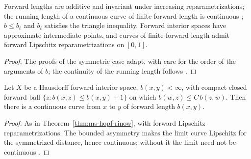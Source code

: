 \begin{theorem}
  \label{thm:ms-fwd-length}
  \leanok
  Forward lengths are additive and invariant under increasing reparametrizations; the running
  length of a continuous curve of finite forward length is continuous \cite[Prop.~3.9]{Men13};
  $b \leq b_\ell$ and $b_\ell$ satisfies the triangle inequality. Forward interior spaces have
  approximate intermediate points, and curves of finite forward length admit forward Lipschitz
  reparametrizations on $[0, 1]$.
\end{theorem}

\begin{proof}
  \leanok
  The proofs of the symmetric case adapt, with care for the order of the arguments of $b$; the
  continuity of the running length follows \cite[Appendix~B.2]{Men13}.
\end{proof}

\begin{theorem}
  \label{thm:ms-fwd-hopf-rinow}
  \leanok
  Let $X$ be a Hausdorff forward interior space, $b(x, y) < \infty$, with compact closed forward
  ball $\{z : b(x, z) \leq b(x, y) + 1\}$ on which $b(w, z) \leq C\, b(z, w)$. Then there is a
  continuous curve from $x$ to $y$ of forward length $b(x, y)$.
\end{theorem}

\begin{proof}
  \leanok
  As in Theorem~\ref{thm:ms-hopf-rinow}, with forward Lipschitz reparametrizations. The bounded
  asymmetry makes the limit curve Lipschitz for the symmetrized distance, hence continuous; without
  it the limit need not be continuous \cite{Men13}.
\end{proof}

